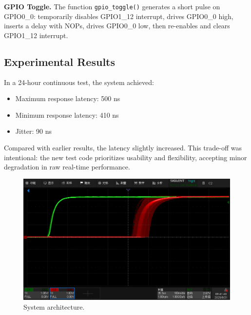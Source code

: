 \documentclass[letterpaper]{article}
\begin{document}
\textbf{GPIO Toggle.} The function \texttt{gpio\_toggle()} generates a short pulse on GPIO0\_0:
temporarily disables GPIO1\_12 interrupt, drives GPIO0\_0 high, inserts a delay with NOPs,
drives GPIO0\_0 low, then re-enables and clears GPIO1\_12 interrupt.

\subsection{Experimental Results}
In a 24-hour continuous test, the system achieved:
\begin{itemize}
    \item Maximum response latency: 500 ns
    \item Minimum response latency: 410 ns
    \item Jitter: 90 ns
\end{itemize}
Compared with earlier results, the latency slightly increased. This trade-off was intentional: the
new test code prioritizes usability and flexibility, accepting minor degradation in raw real-time
performance.

\begin{figure}
    \centering
    \includegraphics[width=0.85\columnwidth]{oscilloscope.png}
    \caption{System architecture.}
    \label{fig:oscilloscope}
\end{figure}
\end{document}
